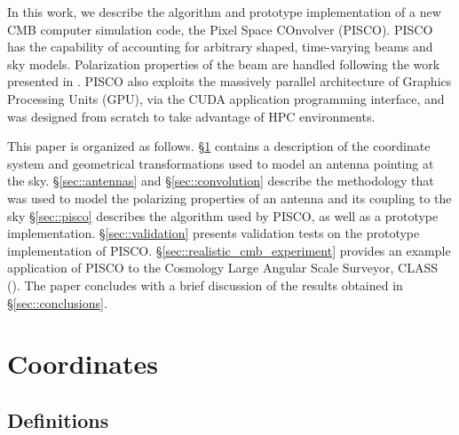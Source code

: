 \documentclass[a4paper,11pt]{article}
\begin{document}

In this work, we describe the algorithm and prototype implementation of a new CMB computer simulation code, the Pixel Space COnvolver (PISCO). PISCO has the capability of accounting for arbitrary shaped, time-varying beams and sky models. Polarization properties of the beam are handled following the work presented in \cite{2007MNRAS.376.1767O}. PISCO also exploits the massively parallel architecture of Graphics Processing Units (GPU), via the CUDA application programming interface, and was designed from scratch to take advantage of HPC environments.

This paper is organized as follows. 
\S\ref{sec::coordinate-systems} contains a description of the coordinate system and geometrical transformations used to model an antenna pointing at the sky.
\S\ref{sec::antennas} and \S\ref{sec::convolution} describe the methodology that was used to model the polarizing properties of an antenna and its coupling to the sky
\S\ref{sec::pisco} describes the algorithm used by PISCO, as well as a prototype implementation. 
\S\ref{sec::validation} presents validation tests on the prototype implementation of PISCO. 
\S\ref{sec::realistic_cmb_experiment} provides an example application of PISCO to the Cosmology Large Angular Scale Surveyor, CLASS (\cite{2016SPIE.9914E..1KH}). 
The paper concludes with a brief discussion of the results obtained in \S\ref{sec::conclusions}.

%
\section{Coordinates}
\label{sec::coordinate-systems}

\subsection{Definitions}
\end{document}
